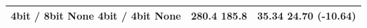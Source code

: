 \begin{tabular}{lll}
\toprule
4bit / 8bit None 4bit / 4bit None & 280.4 185.8 & 35.34 24.70 (-10.64) \\
\midrule
\bottomrule
\end{tabular}
